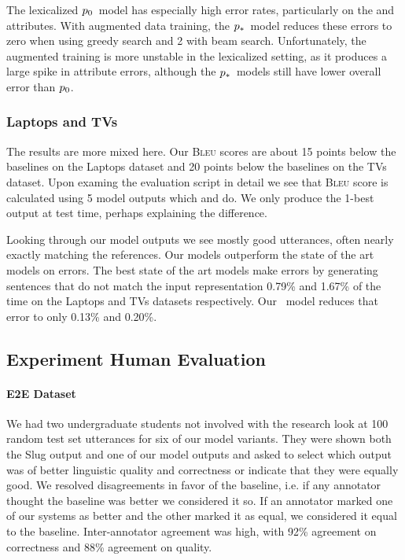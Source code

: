 The lexicalized $p_0$~model has especially high error rates, 
particularly on the  and  attributes.
With augmented data training, the $p_*$~model reduces these errors
 to zero when using greedy search and 2 with beam search. Unfortunately,
the augmented training is more unstable in the lexicalized setting, 
as it produces a large spike in  attribute errors, although
the $p_*$~models still have lower overall error than  $p_0$.


\subsubsection{Laptops and TVs}
The results are more mixed here. Our \textsc{Bleu} scores are about 15 points 
below the baselines on the Laptops dataset and 20 points below the 
baselines on the TVs dataset. 
Upon examing  the evaluation script in detail we see that 
\textsc{Bleu} score is calculated using 5 model outputs which \citet{juraska2018}
and \citet{wen2016} do. We only produce the 1-best output
at test time,
perhaps explaining the difference.

Looking through our model
outputs we see mostly good utterances, often nearly exactly matching the 
references.
Our models outperform the state of the art models on errors. The best state of the art models  make errors by generating sentences that do not match the input representation 0.79\%  and 1.67\% of the time on the Laptops and TVs datasets
respectively. Our \auggen~model reduces that error to only 0.13\% and 
0.20\%.





\subsection{Experiment Human Evaluation} 

\paragraph{E2E Dataset} We had two undergraduate students not involved with 
the research look at 100 random test set utterances for six
of our model variants. They were shown
both the Slug output and one of our model outputs and asked to select
which output was of better linguistic quality and correctness or 
indicate that they were equally good.
 We resolved disagreements in favor of the baseline,
i.e. if any annotator thought the baseline was better we considered it so.
If an annotator marked one of our 
systems as better and the other marked it as equal, we considered it 
equal to the baseline. Inter-annotator agreement was high, with 92\% agreement on correctness
and 88\% agreement on quality.

